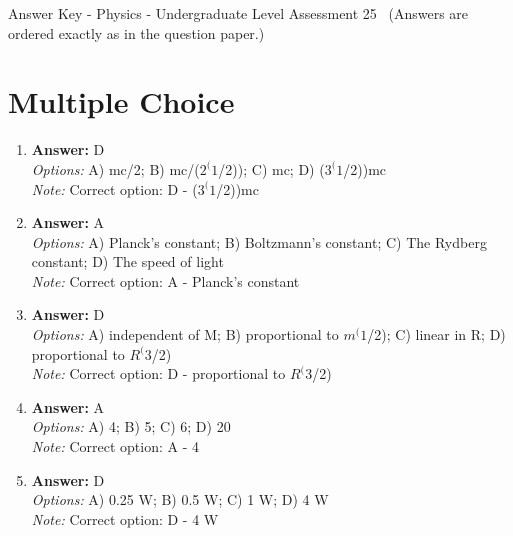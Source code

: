 \documentclass[12pt]{article}
\begin{document}
\begin{center}
Answer Key - Physics - Undergraduate Level Assessment 25 \
\small (Answers are ordered exactly as in the question paper.)
\end{center}

\section*{Multiple Choice}
\begin{enumerate}[label=\arabic*.]
\item \textbf{Answer:} D
\\ \textit{Options:} A) mc/2; B) mc/($2^(1$/2)); C) mc; D) ($3^(1$/2))mc
\\ \textit{Note:} Correct option: D - ($3^(1$/2))mc
\item \textbf{Answer:} A
\\ \textit{Options:} A) Planck's constant; B) Boltzmann's constant; C) The Rydberg constant; D) The speed of light
\\ \textit{Note:} Correct option: A - Planck's constant
\item \textbf{Answer:} D
\\ \textit{Options:} A) independent of M; B) proportional to $m^(1$/2); C) linear in R; D) proportional to $R^(3$/2)
\\ \textit{Note:} Correct option: D - proportional to $R^(3$/2)
\item \textbf{Answer:} A
\\ \textit{Options:} A) 4; B) 5; C) 6; D) 20
\\ \textit{Note:} Correct option: A - 4
\item \textbf{Answer:} D
\\ \textit{Options:} A) 0.25 W; B) 0.5 W; C) 1 W; D) 4 W
\\ \textit{Note:} Correct option: D - 4 W
\end{enumerate}
\end{document}
